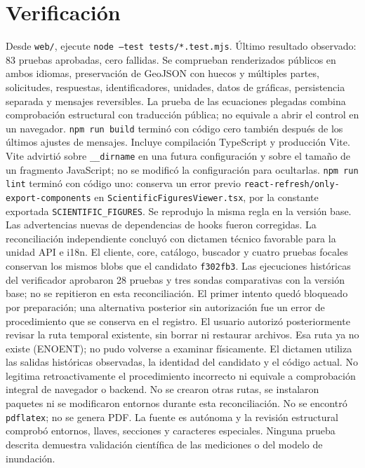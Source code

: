 \documentclass[11pt]{article}
\begin{document}
\section{Verificación}
Desde \texttt{web/}, ejecute \texttt{node --test tests/*.test.mjs}.
Último resultado observado: 83 pruebas aprobadas, cero fallidas.
Se comprueban renderizados públicos en ambos idiomas, preservación de
GeoJSON con huecos y múltiples partes, solicitudes, respuestas, identificadores,
unidades, datos de gráficas, persistencia separada y mensajes reversibles.
La prueba de las ecuaciones plegadas combina comprobación estructural con
traducción pública; no equivale a abrir el control en un navegador.
\texttt{npm run build} terminó con código cero también después de los
últimos ajustes de mensajes. Incluye compilación TypeScript y producción Vite.
Vite advirtió sobre \texttt{\_\_dirname} en una futura configuración y sobre
el tamaño de un fragmento JavaScript; no se modificó la configuración para ocultarlas.
\texttt{npm run lint} terminó con código uno: conserva un error previo
\texttt{react-refresh/only-export-components} en
\texttt{ScientificFiguresViewer.tsx}, por la constante exportada
\texttt{SCIENTIFIC\_FIGURES}. Se reprodujo la misma regla en la versión base.
Las advertencias nuevas de dependencias de hooks fueron corregidas.
La reconciliación independiente concluyó con dictamen técnico favorable para
la unidad API e i18n. El cliente, core, catálogo, buscador y cuatro pruebas
focales conservan los mismos blobs que el candidato \texttt{f302fb3}.
Las ejecuciones históricas del verificador aprobaron 28 pruebas y tres sondas
comparativas con la versión base; no se repitieron en esta reconciliación.
El primer intento quedó bloqueado por preparación; una alternativa posterior
sin autorización fue un error de procedimiento que se conserva en el registro.
El usuario autorizó posteriormente revisar la ruta temporal existente, sin
borrar ni restaurar archivos. Esa ruta ya no existe (ENOENT); no pudo volverse
a examinar físicamente. El dictamen utiliza las salidas históricas observadas,
la identidad del candidato y el código actual. No legitima retroactivamente
el procedimiento incorrecto ni equivale a comprobación integral de navegador
o backend. No se crearon otras rutas, se instalaron paquetes ni se modificaron
entornos durante esta reconciliación.
No se encontró \texttt{pdflatex}; no se genera PDF. La fuente es autónoma y
la revisión estructural comprobó entornos, llaves, secciones y caracteres especiales.
Ninguna prueba descrita demuestra
validación científica de las mediciones o del modelo de inundación.
\end{document}
